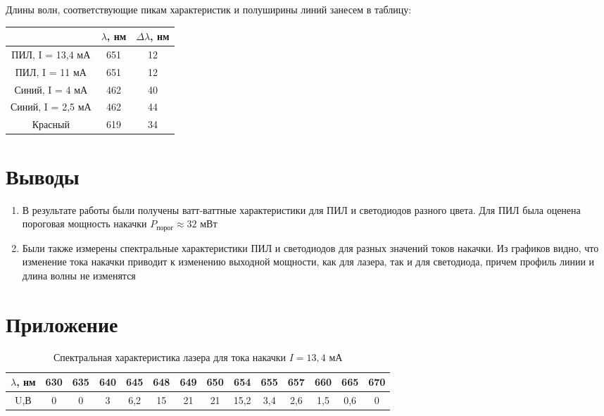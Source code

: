 \documentclass[a4paper,12pt]{article}
\begin{document}
\newpage

Длины волн, соответствующие пикам характеристик и полуширины линий занесем в таблицу:

\begin{table}[h]
\centering
\begin{tabular}{|c|c|c|}
\hline
                  & $\lambda$, нм & $\Delta \lambda$, нм \\ \hline
ПИЛ, I = 13,4 мА  & 651        & 12               \\ \hline
ПИЛ, I = 11 мА    & 651        & 12               \\ \hline
Синий, I = 4 мА   & 462        & 40               \\ \hline
Синий, I = 2,5 мА & 462        & 44               \\ \hline
Красный           & 619        & 34               \\ \hline
\end{tabular}
\end{table}

\section{Выводы}

\begin{enumerate}
	\item В результате работы были получены ватт-ваттные характеристики для ПИЛ и светодиодов разного цвета. Для ПИЛ была оценена пороговая мощность накачки $P_{\text{порог}} \approx 32$ мВт 
	\item Были также измерены спектральные характеристики ПИЛ и светодиодов для разных значений токов накачки. Из графиков видно, что изменение тока накачки приводит к изменению выходной мощности, как для лазера, так и для светодиода, причем профиль линии и длина волны не изменятся
\end{enumerate}

\newpage

\section{Приложение}

\begin{table}[h]
	\caption{Спектральная характеристика лазера для тока накачки $I = 13,4$ мА}
	\begin{tabular}{|c|c|c|c|c|c|c|c|c|c|c|c|c|c|}
	\hline
	$\lambda$, нм & 630 & 635 & 640 & 645 & 648 & 649 & 650 & 654  & 655 & 657 & 660 & 665 & 670 \\ \hline
	U,В        & 0   & 0   & 3   & 6,2 & 15  & 21  & 21  & 15,2 & 3,4 & 2,6 & 1,5 & 0,6 & 0   \\ \hline
	\end{tabular}
	\end{table}
\end{document}
